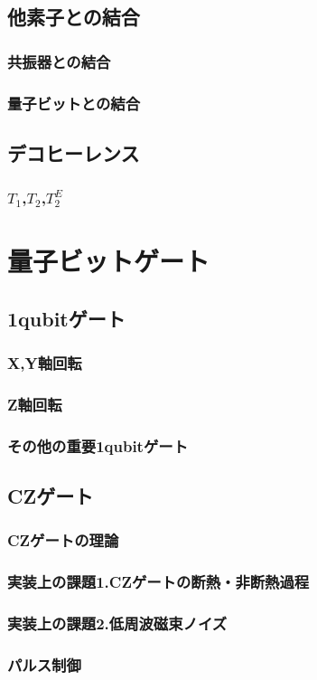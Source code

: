     \subsection{他素子との結合}
        \subsubsection{共振器との結合}
        \subsubsection{量子ビットとの結合}
    \subsection{デコヒーレンス}
        \subsubsection{$T_1$,$T_2$,$T_2^E$}

\section{量子ビットゲート}
    \subsection{1qubitゲート}
        \subsubsection{X,Y軸回転}
        \subsubsection{Z軸回転}
        \subsubsection{その他の重要1qubitゲート}
    \subsection{CZゲート}
        \subsubsection{CZゲートの理論}
        \subsubsection{実装上の課題1.CZゲートの断熱・非断熱過程}
        \subsubsection{実装上の課題2.低周波磁束ノイズ}
        \subsubsection{パルス制御}

        
        